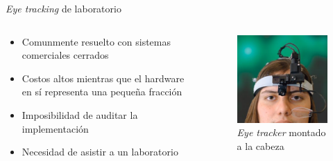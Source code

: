 \documentclass[aspectratio=169]{beamer}
\begin{document}
\begin{frame}{\textit{Eye tracking} de laboratorio}
  \begin{columns}
    \begin{column}{0.5\textwidth}
      \begin{itemize}
        \item Comunmente resuelto con sistemas comerciales cerrados
        \item Costos altos mientras que el hardware en sí representa una
          pequeña fracción
        \item Imposibilidad de auditar la implementación
        \item Necesidad de asistir a un laboratorio
      \end{itemize}
    \end{column}

    \begin{column}{0.5\textwidth}
      \begin{figure}
        \centering
        \includegraphics[width=0.8\linewidth]{img/eye-tracker-head-mounted.jpg}
        \caption{\textit{Eye tracker} montado a la cabeza}
      \end{figure}
    \end{column}
  \end{columns}
\end{frame}
\end{document}

